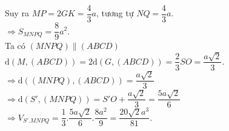 \begin{ex}
{		Suy ra $MP=2GK=\dfrac{4}{3}a$, tương tự $NQ=\dfrac{4}{3}a$.\\
		$\Rightarrow{S_{MNPQ}}=\dfrac{8}{9}{a^2}$.\\
		Ta có $\left(MNPQ\right)\parallel\left(ABCD\right)$\\
		$\mathrm{d}\left(M,\left(ABCD\right)\right)=2\mathrm{d}\left(G,\left(ABCD\right)\right)=\dfrac{2}{3}SO=\dfrac{a\sqrt 2}{3}$.\\
		$\Rightarrow \mathrm{d}\left(\left(MNPQ\right),\left(ABCD\right)\right)=\dfrac{a\sqrt 2}{3}$\\
		$\Rightarrow \mathrm{d}\left(S',\left(MNPQ\right)\right)=S'O+\dfrac{a\sqrt 2}{3}=\dfrac{5a\sqrt 2}{6}$\\
		$\Rightarrow{V_{S'.MNPQ}}=\dfrac{1}{3}.\dfrac{5a\sqrt 2}{6}.\dfrac{8a^2}{9}=\dfrac{20\sqrt 2a^3}{81}$.}
\end{ex}

